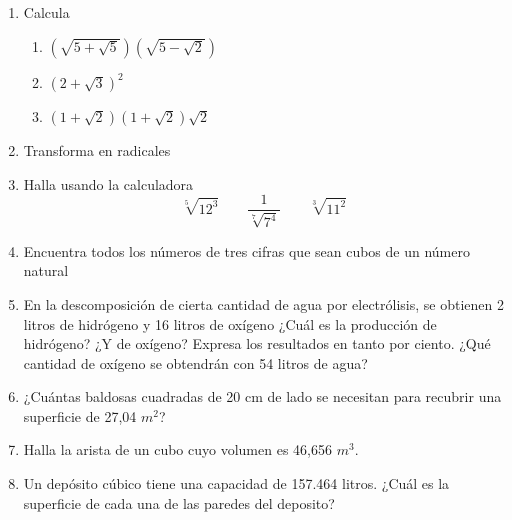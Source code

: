 \documentclass[10pt,letter,twoside]{article}
\begin{document}
\begin{multicols}{2}
\begin{enumerate}
\begin{enumerate}
  \end{enumerate}
  \item Calcula
  \begin{enumerate}
    \item $ \left(\sqrt{5+\sqrt{5}}\right)\left(\sqrt{5-\sqrt{2}}\right) $
    \item $ (2+\sqrt{3})^2 $
    \item $ (1+\sqrt{2})(1+\sqrt{2})\sqrt{2} $
  \end{enumerate}
  \item Transforma en radicales
  \begin{enumerate}
  \end{enumerate}
  \item Halla usando la calculadora
  \[ \sqrt[5]{12^3}\qquad \dfrac{1}{\sqrt[7]{7^4}}\qquad \sqrt[3]{11^2} \]
  \item Encuentra todos los números de tres cifras que sean cubos de un número natural
  \item En la descomposición de cierta cantidad de agua por electrólisis, se obtienen 2 litros de hidrógeno y 16 litros de oxígeno ¿Cuál es la producción de hidrógeno? ¿Y de oxígeno? Expresa los resultados en tanto por ciento. ¿Qué cantidad de oxígeno se obtendrán con 54 litros de agua?
  \item ¿Cuántas baldosas cuadradas de 20 cm de lado se necesitan para recubrir una superficie de 27,04 $ m^2 $?
  \item Halla la arista de un cubo cuyo volumen es 46,656 $m^3$.
  \item Un depósito cúbico tiene una capacidad de 157.464 litros. ¿Cuál es la superficie de cada una de las paredes del deposito?
\end{enumerate}
\end{multicols}
\end{document}
